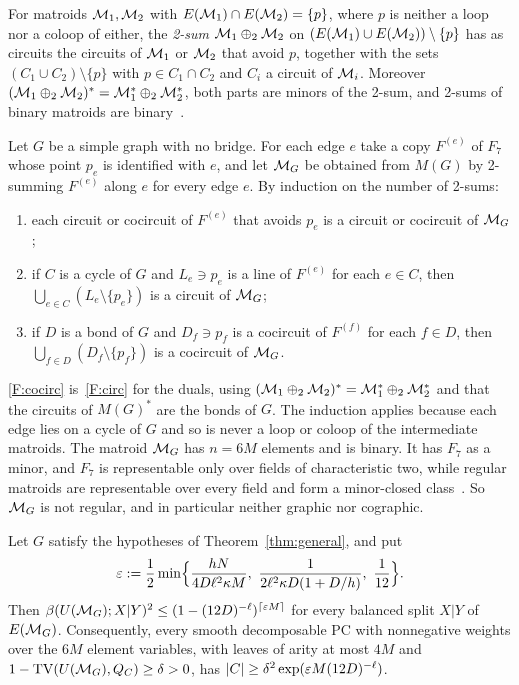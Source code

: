 For matroids $\mathcal{M}_1,\mathcal{M}_2$ with $E(\mathcal{M}_1)\cap E(\mathcal{M}_2)=\{p\}$, where $p$ is neither a loop nor a coloop of either, the \emph{2-sum} $\mathcal{M}_1\oplus_2\mathcal{M}_2$ on $(E(\mathcal{M}_1)\cup E(\mathcal{M}_2))\setminus\{p\}$ has as circuits the circuits of $\mathcal{M}_1$ or $\mathcal{M}_2$ that avoid $p$, together with the sets $(C_1\cup C_2)\setminus\{p\}$ with $p\in C_1\cap C_2$ and $C_i$ a circuit of $\mathcal{M}_i$. Moreover $(\mathcal{M}_1\oplus_2\mathcal{M}_2)^*=\mathcal{M}_1^*\oplus_2\mathcal{M}_2^*$, both parts are minors of the 2-sum, and 2-sums of binary matroids are binary~\cite[Section~7.1]{Oxley11}.

Let $G$ be a simple graph with no bridge. For each edge $e$ take a copy $F^{(e)}$ of $F_7$ whose point $p_e$ is identified with $e$, and let $\mathcal{M}_G$ be obtained from $M(G)$ by 2-summing $F^{(e)}$ along $e$ for every edge $e$. By induction on the number of 2-sums:
\begin{enumerate}[label=(F\arabic*)]
\item\label{F:local} each circuit or cocircuit of $F^{(e)}$ that avoids $p_e$ is a circuit or cocircuit of $\mathcal{M}_G$;
\item\label{F:circ} if $C$ is a cycle of $G$ and $L_e\ni p_e$ is a line of $F^{(e)}$ for each $e\in C$, then $\bigcup_{e\in C}(L_e\setminus\{p_e\})$ is a circuit of $\mathcal{M}_G$;
\item\label{F:cocirc} if $D$ is a bond of $G$ and $D_f\ni p_f$ is a cocircuit of $F^{(f)}$ for each $f\in D$, then $\bigcup_{f\in D}(D_f\setminus\{p_f\})$ is a cocircuit of $\mathcal{M}_G$.
\end{enumerate}
\ref{F:cocirc} is~\ref{F:circ} for the duals, using $(\mathcal{M}_1\oplus_2\mathcal{M}_2)^*=\mathcal{M}_1^*\oplus_2\mathcal{M}_2^*$ and that the circuits of $M(G)^*$ are the bonds of $G$. The induction applies because each edge lies on a cycle of $G$ and so is never a loop or coloop of the intermediate matroids. The matroid $\mathcal{M}_G$ has $n=6M$ elements and is binary. It has $F_7$ as a minor, and $F_7$ is representable only over fields of characteristic two, while regular matroids are representable over every field and form a minor-closed class~\cite{Oxley11}. So $\mathcal{M}_G$ is not regular, and in particular neither graphic nor cographic.

\begin{proposition}\label{prop:fano}
Let $G$ satisfy the hypotheses of Theorem~\ref{thm:general}, and put
\[
  \varepsilon:=\frac12\min\Bigl\{\frac{hN}{4D\ell^2\kappa M},\ \frac1{2\ell^2\kappa D(1+D/h)},\ \frac1{12}\Bigr\}.
\]
Then $\beta(U(\mathcal{M}_G);X|Y)^2\le(1-(12D)^{-\ell})^{\lceil\varepsilon M\rceil}$ for every balanced split $X|Y$ of $E(\mathcal{M}_G)$. Consequently, every smooth decomposable PC with nonnegative weights over the $6M$ element variables, with leaves of arity at most $4M$ and $1-\mathrm{TV}(U(\mathcal{M}_G),Q_C)\ge\delta>0$, has $\lvert C\rvert\ge\delta^2\exp(\varepsilon M(12D)^{-\ell})$.
\end{proposition}

